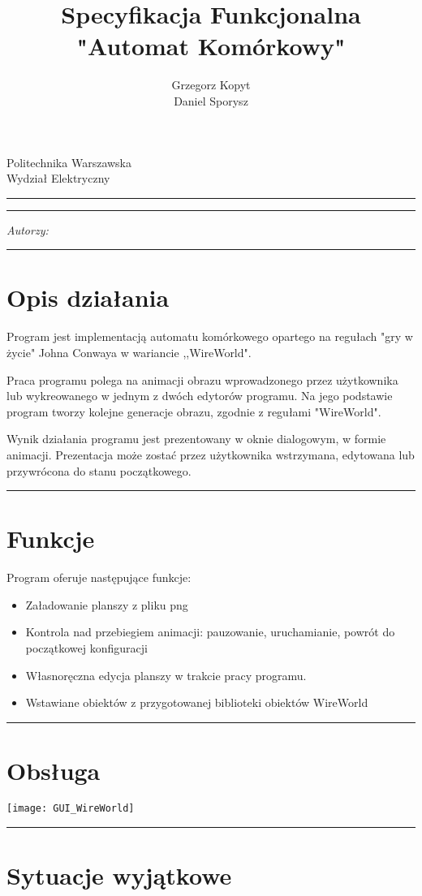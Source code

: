 \documentclass[a4paper,11pt]{article}
\author{Grzegorz Kopyt\\
Daniel Sporysz}
\title{Specyfikacja Funkcjonalna \\
"Automat Komórkowy"}
\makeatletter
\newcommand{\linia}{\rule{\linewidth}{0.4mm}}
\renewcommand{\maketitle}{\begin{titlepage}
    \vspace*{2cm}
    \begin{center}\LARGE
    Politechnika Warszawska\\
    Wydział Elektryczny\\
    \end{center}
    \vspace{5cm}
    \noindent\linia
    \begin{center}
      \LARGE \textsc{\@title}
         \end{center}
     \linia
    \vspace{0.5cm}
    \begin{flushright}
    \begin{minipage}{5cm}
    \textit{Autorzy:}\\
    \normalsize \textsc{\@author} \par
    \end{minipage}
    \vspace{5cm}
     \end{flushright}
    \vspace*{\stretch{6}}
    \begin{center}
    \@date
    \end{center}
  \end{titlepage}%
}
\makeatother
\begin{document}
\maketitle


\tableofcontents
\vspace{1cm}
\noindent\linia
\section{Opis działania}
Program jest implementacją automatu komórkowego opartego na regułach "gry w życie" Johna Conwaya w wariancie ,,WireWorld".

Praca programu polega na animacji obrazu wprowadzonego przez użytkownika lub wykreowanego w jednym z dwóch edytorów programu. Na jego podstawie program tworzy kolejne generacje obrazu, zgodnie z regułami "WireWorld".

Wynik działania programu jest prezentowany w oknie dialogowym, w formie animacji. Prezentacja może zostać przez użytkownika wstrzymana, edytowana lub przywrócona do stanu początkowego.

\noindent\linia
\section{Funkcje}
Program oferuje następujące funkcje:
\begin{itemize}
\item Załadowanie planszy z pliku png
\item Kontrola nad przebiegiem animacji: pauzowanie, uruchamianie, powrót do początkowej konfiguracji
\item Własnoręczna edycja planszy w trakcie pracy programu.
\item Wstawiane obiektów z przygotowanej biblioteki obiektów WireWorld
\end{itemize}



\noindent\linia
\section{Obsługa}
\texttt{[image: GUI\_WireWorld]}


\noindent\linia
\section{Sytuacje wyjątkowe}
\end{document}
